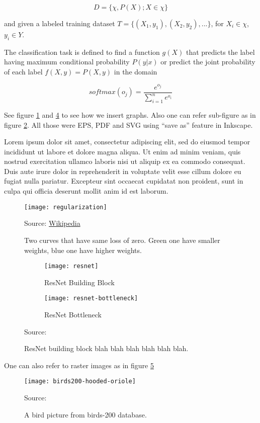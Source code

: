 \begin{equation}\label{eq:domain}
D = \{ \chi , P(X) ; X \in \chi \}
\end{equation}

and given a labeled training dataset \( T = \{ (X_1, y_1), (X_2, y_2), ... \} \),
for \( X_i \in \chi \), \( y_i \in Y \).

The classification task is defined\autocite{pan2010survey} to find a function \( g(X) \) that predicts the label
having maximum conditional probability \( P(y|x) \) 
or predict the joint probability of each label \( f(X,y) = P(X,y) \) in the domain

\begin{equation}
softmax(o_j) = \frac{e^{o_j}}{ \sum\limits_{i=1}^n e^{o_i} }
\label{eq:softmax}
\end{equation}

See figure \ref{fig:regularization} and \ref{fig:resnet} to see how we insert graphs.
Also one can refer sub-figure as in figure \ref{fig:resnet-block}.
All those were EPS, PDF and SVG using ``save as'' feature in Inkscape.


Lorem ipsum dolor sit amet, consectetur adipiscing elit,
sed do eiusmod tempor incididunt ut labore et dolore magna aliqua.
Ut enim ad minim veniam, quis nostrud exercitation ullamco laboris nisi ut aliquip ex ea commodo consequat.
Duis aute irure dolor in reprehenderit in voluptate velit esse cillum dolore eu fugiat nulla pariatur.
Excepteur sint occaecat cupidatat non proident, sunt in culpa qui officia deserunt mollit anim id est laborum.

\begin{figure}[!h]
\centering
\texttt{[image: regularization]}
\caption{Two curves that have same loss of zero. Green one have smaller weights, blue one have higher weights. }\label{fig:regularization}
{Source: \href{https://commons.wikimedia.org/wiki/File:Regularization.svg}{Wikipedia}\hfill}
\end{figure}


\begin{figure}[!h]
\centering
    \begin{subfigure}[b]{0.4\textwidth}
        \texttt{[image: resnet]}
        \caption{ResNet Building Block}\label{fig:resnet-block}
    \end{subfigure}
    \begin{subfigure}[b]{0.4\textwidth}
        \texttt{[image: resnet-bottleneck]}
        \caption{ResNet Bottleneck}\label{fig:resnet-bottleneck}
    \end{subfigure}
\caption{ResNet building block blah blah blah blah blah blah.}\label{fig:resnet}
{Source: \cite{he2016deep}\hfill}
\end{figure}


One can also refer to raster images as in figure \ref{fig:birds200}

\begin{figure}[!h]
\centering
\texttt{[image: birds200-hooded-oriole]}
\caption{A bird picture from birds-200 database.}\label{fig:birds200}
{Source: \cite{WahCUB_200_2011}\hfill}
\end{figure}

